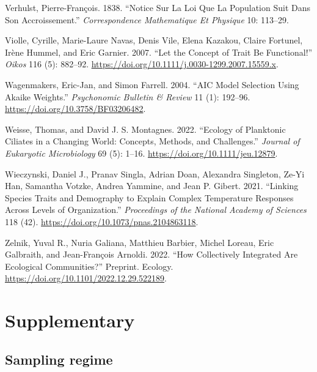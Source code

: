 \documentclass[
  letterpaper,
  DIV=11,
  numbers=noendperiod]{scrartcl}
\begin{document}
\begin{CSLReferences}
Verhulst, Pierre-François. 1838. {``Notice Sur La Loi Que La Population
Suit Dans Son Accroissement.''} \emph{Correspondence Mathematique Et
Physique} 10: 113--29.

Violle, Cyrille, Marie-Laure Navas, Denis Vile, Elena Kazakou, Claire
Fortunel, Irène Hummel, and Eric Garnier. 2007. {``Let the Concept of
Trait Be Functional!''} \emph{Oikos} 116 (5): 882--92.
\url{https://doi.org/10.1111/j.0030-1299.2007.15559.x}.

Wagenmakers, Eric-Jan, and Simon Farrell. 2004. {``{AIC} Model Selection
Using {Akaike} Weights.''} \emph{Psychonomic Bulletin \& Review} 11 (1):
192--96. \url{https://doi.org/10.3758/BF03206482}.

Weisse, Thomas, and David J. S. Montagnes. 2022. {``Ecology of
Planktonic Ciliates in a Changing World: {Concepts}, Methods, and
Challenges.''} \emph{Journal of Eukaryotic Microbiology} 69 (5): 1--16.
\url{https://doi.org/10.1111/jeu.12879}.

Wieczynski, Daniel J., Pranav Singla, Adrian Doan, Alexandra Singleton,
Ze-Yi Han, Samantha Votzke, Andrea Yammine, and Jean P. Gibert. 2021.
{``Linking Species Traits and Demography to Explain Complex Temperature
Responses Across Levels of Organization.''} \emph{Proceedings of the
National Academy of Sciences} 118 (42).
\url{https://doi.org/10.1073/pnas.2104863118}.

Zelnik, Yuval R., Nuria Galiana, Matthieu Barbier, Michel Loreau, Eric
Galbraith, and Jean-François Arnoldi. 2022. {``How Collectively
Integrated Are Ecological Communities?''} Preprint. {Ecology}.
\url{https://doi.org/10.1101/2022.12.29.522189}.

\end{CSLReferences}

\newpage{}

\section{Supplementary}\label{supplementary}

\subsection{Sampling regime}\label{sec-sampling_times}
\end{document}
